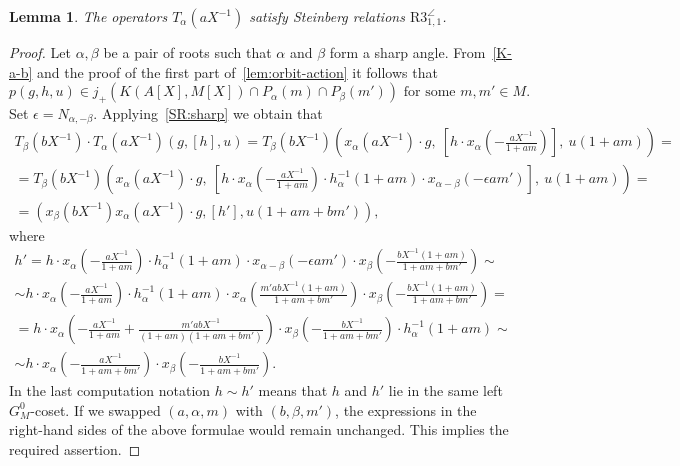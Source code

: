 \documentclass[oneside, 8pt]{amsart}
\newtheorem{lemma}{Lemma}
\theoremstyle{remark}
\theoremstyle{definition}
\numberwithin{lemma}{section}
\numberwithin{prop}{section}
\numberwithin{corollary}{section}
\numberwithin{externaltheorem}{section}
\numberwithin{equation}{section}
\begin{document}
\begin{lemma} \label{R3_1_1} The operators $T_\alpha(aX^{-1})$ satisfy Steinberg relations $\mathrm{R3}_{1,1}^{\angle}$. \end{lemma}
\begin{proof}
Let $\alpha, \beta$ be a pair of roots such that $\alpha$ and $\beta$ form a sharp angle.
From~\cref{K-a-b} and the proof of the first part of~\cref{lem:orbit-action} it follows that \[p(g, h, u) \in j_+\left(K(A[X], M[X]) \cap P_\alpha(m) \cap P_{\beta}(m')\right)\text{ for some }m,m' \in M.\]
Set $\epsilon = N_{\alpha,-\beta}$. Applying~\cref{SR:sharp} we obtain that
\begin{multline} \nonumber
 T_\beta(bX^{-1}) \cdot T_\alpha(aX^{-1}) \left(g, [h], u\right) = 
 T_\beta(bX^{-1}) \left(x_\alpha(aX^{-1})\cdot g,\ \left[h \cdot x_\alpha\left(-\tfrac{aX^{-1}}{1 + am}\right)\right],\ u(1 + am)\right) = \\ 
 = T_\beta(bX^{-1}) \left(x_\alpha(aX^{-1})\cdot g,\ \left[h \cdot x_\alpha\left(-\tfrac{aX^{-1}}{1 + am}\right) \cdot h^{-1}_\alpha(1 + am) \cdot x_{\alpha-\beta}(-\epsilon am')\right],\ u(1 + am)\right) = \\
 = (x_\beta(bX^{-1}) x_\alpha(aX^{-1}) \cdot g, [h'], u(1 + am + bm')), \end{multline}
where 
\begin{multline} \nonumber
 h' = h \cdot x_\alpha\left(-\tfrac{aX^{-1}}{1 + am}\right) \cdot h^{-1}_\alpha(1 + am) \cdot x_{\alpha-\beta}(-\epsilon am') \cdot x_\beta\left(-\tfrac{bX^{-1}(1+am)}{1 + am + bm'}\right) \sim \\
    \sim h \cdot x_\alpha\left(-\tfrac{aX^{-1}}{1 + am}\right) \cdot h^{-1}_\alpha(1 + am) \cdot x_{\alpha}\left(\tfrac{m'abX^{-1}(1+am)}{1 + am + bm'}\right) \cdot x_\beta\left(-\tfrac{bX^{-1}(1+am)}{1 + am + bm'}\right) = \\
 = h \cdot x_\alpha\left(-\tfrac{aX^{-1}}{1 + am} + \tfrac{m'abX^{-1}}{(1+am)(1 + am + bm')}\right) \cdot x_\beta\left(-\tfrac{bX^{-1}}{1 + am + bm'}\right) \cdot h^{-1}_\alpha(1 + am) \sim \\
 \sim h \cdot x_\alpha\left(-\tfrac{aX^{-1}}{1 + am + bm'}\right) \cdot x_\beta\left(-\tfrac{bX^{-1}}{1 + am + bm'}\right).
\end{multline}
In the last computation notation $h \sim h'$ means that $h$ and $h'$ lie in the same left $G_M^0$-coset.
If we swapped $(a,\alpha,m)$ with $(b,\beta,m')$, 
the expressions in the right-hand sides of the above formulae would remain unchanged. This implies the required assertion.
\end{proof}
\end{document}
